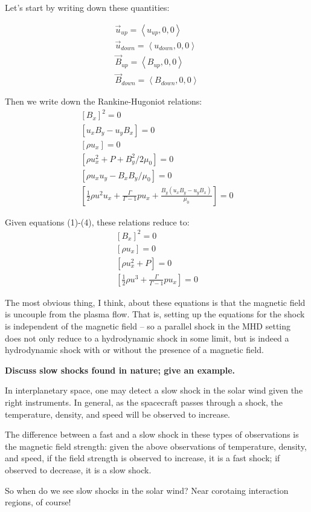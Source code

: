 Let's start by writing down these quantities:
\begin{center}
  \begin{align}
    \vec{u}_{up} = \left< u_{up}, 0, 0 \right> \\
    \vec{u}_{down} = \left< u_{down}, 0, 0 \right>\\
    \vec{B}_{up} = \left< B_{up}, 0, 0 \right>\\ 
    \vec{B}_{down} = \left< B_{down}, 0, 0 \right> 
  \end{align}
\end{center}

Then we write down the Rankine-Hugoniot relations:
\begin{align}
  \left[ B_{x}\right]^{2} = 0 \\
  \left[ u_{x}B_{y} - u_{y}B_{x}\right] = 0 \\
  \left[ \rho u_{x}\right] = 0 \\
  \left[ \rho u_{x}^{2}+P+B_{y}^{2}/2\mu_{0}\right] = 0 \\
  \left[ \rho u_{x}u_{y}-B_{x}B_{y}/\mu_{0}\right] = 0 \\
  \left[ \frac{1}{2}\rho
  u^{2}u_{x}+\frac{\Gamma}{\Gamma-1}pu_{x}+\frac{ B_{y}(
  u_{x}B_{y}-u_{y}B_{x} )}{\mu_{0}}\right] = 0
\end{align}

Given equations (1)-(4), these relations reduce to:
\begin{align}
  \left[ B_{x}\right]^{2} = 0 \\
  \left[ \rho u_{x}\right] = 0 \\
  \left[ \rho u_{x}^{2}+P \right] = 0 \\
  \left[ \frac{1}{2}\rho
  u^{3}+\frac{\Gamma}{\Gamma-1}pu_{x}\right] = 0
\end{align}

The most obvious thing, I think, about these equations is that the
magnetic field is uncouple from the plasma flow. That is, setting up the
equations for the shock is independent of the magnetic field -- so a
parallel shock in the MHD setting does not only reduce to a hydrodynamic
shock in some limit, but is indeed a hydrodynamic shock with or without
the presence of a magnetic field.




\textbf{Discuss slow shocks found in nature; give an example.}

In interplanetary space, one may detect a slow shock in the solar wind given the right
instruments. In general, as the spacecraft passes through a shock, the
temperature, density, and speed will be observed to increase.

The difference between a fast and a slow shock in these types of
observations is the magnetic field strength: given the above
observations of temperature, density, and speed, if the field strength is observed to
increase, it is a fast shock; if observed to decrease, it is a slow
shock.

So when do we see slow shocks in the solar wind? Near corotaing
interaction regions, of course! 
